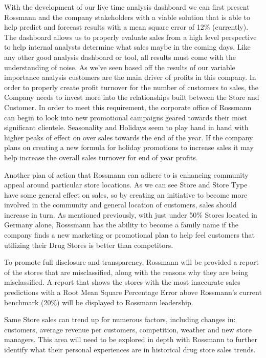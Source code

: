 \documentclass[DIV=calc, paper=a4, fontsize=11pt]{scrartcl}	 %
\begin{document}
With the development of our live time analysis dashboard we can first present 
Rossmann and the company stakeholders with a viable solution that is able to help predict and 
forecast results with a mean square error of 12\% (currently). The dashboard allows us to properly evaluate sales from a high level perspective to help internal analysts determine what sales maybe in the 
coming days. Like any other good analysis dashboard or tool, all results must come with the 
understanding of noise. As we’ve seen based off the results of our variable importance analysis 
customers are the main driver of profits in this company. In order to properly create profit 
turnover for the number of customers to sales, the Company needs to invest more into the 
relationships built between the Store and Customer. In order to meet this requirement, the 
corporate office of Rossmann can begin to look into new promotional campaigns geared 
towards their most significant clientele. Seasonality and Holidays seem to play hand in hand 
with higher peaks of effect on over sales towards the end of the year. If the company plans on 
creating a new formula for holiday promotions to increase sales it may help increase the overall 
sales turnover for end of year profits. 

Another plan of action that Rossmann can adhere to is enhancing community appeal 
around particular store locations. As we can see Store and Store Type have some general effect 
on sales, so by creating an initiative to become more involved in the community and general 
location of customers, sales should increase in turn. As mentioned previously, with just under 
50\% Stores located in Germany alone, Rosssmann has the ability to become a family name if 
the company finds a new marketing or promotional plan to help feel customers that utilizing 
their Drug Stores is better than competitors.

To promote full disclosure and transparency, Rossmann will be provided a report of the stores that are misclassified, along with the reasons why they are being misclassified. A report that shows the stores with the most inaccurate sales predictions with a Root Mean Square Percentage Error above Rossmann’s current benchmark (20\%) will be displayed to Rossmann leadership.

Same Store sales can trend up for numerous factors, including changes in: customers, average revenue per customers, competition, weather and new store managers. This area will need to be explored in depth with Rossmann to further identify what their personal experiences are in historical drug store sales trends.
\end{document}
